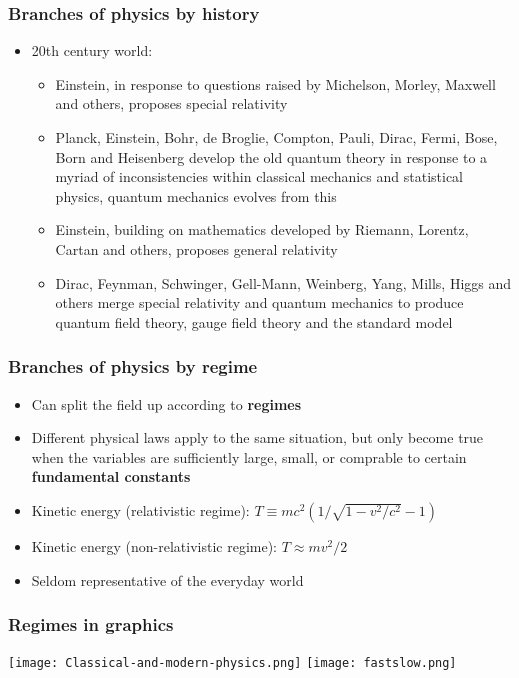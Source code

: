 \documentclass{beamer}
\begin{document}
\begin{frame}
\frametitle{Branches of physics by history}
\begin{itemize}
  \item<1-> 20th century world:
    \begin{itemize}
      \item<2-> Einstein, in response to questions raised by Michelson, Morley, Maxwell and others, proposes special relativity
      \item<3-> Planck, Einstein, Bohr, de Broglie, Compton, Pauli, Dirac, Fermi, Bose, Born and Heisenberg develop the old quantum theory in response to a myriad of inconsistencies within classical mechanics and statistical physics, quantum mechanics evolves from this
      \item<4-> Einstein, building on mathematics developed by Riemann, Lorentz, Cartan and others, proposes general relativity
      \item<5-> Dirac, Feynman, Schwinger, Gell-Mann, Weinberg, Yang, Mills, Higgs and others merge special relativity and quantum mechanics to produce quantum field theory, gauge field theory and the standard model
    \end{itemize}
\end{itemize}
\end{frame}

\begin{frame}
\frametitle{Branches of physics by regime}
\begin{itemize}
  \item<1-> Can split the field up according to \textbf{regimes}
  \item<2-> Different physical laws apply to the same situation, but only become true when the variables are sufficiently large, small, or comprable to certain \textbf{fundamental constants}
  \item<3-> Kinetic energy (relativistic regime): $T\equiv mc^2\left(1/\sqrt{1-v^2/c^2}-1\right)$
  \item<4-> Kinetic energy (non-relativistic regime): $T\approx mv^2/2$
  \item<5-> Seldom representative of the everyday world
\end{itemize}
\end{frame}

\begin{frame}
  \frametitle{Regimes in graphics}
\center
\texttt{[image: Classical-and-modern-physics.png]}
\texttt{[image: fastslow.png]}
\end{frame}
\end{document}
